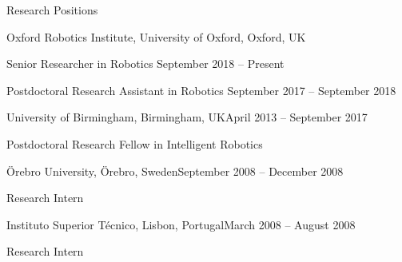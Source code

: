
\begin{rSection}{Research Positions}

\begin{rSubsection}{Oxford Robotics Institute, University of Oxford, Oxford, UK}{}{}{}
\item Senior Researcher in Robotics \hfill September 2018 -- Present 
\item Postdoctoral Research Assistant in Robotics \hfill September 2017 -- September 2018 
\end{rSubsection}

\begin{rSubsection}{University of Birmingham, Birmingham, UK}{April 2013 -- September 2017}{}{}
\item Postdoctoral Research Fellow in Intelligent Robotics 
\end{rSubsection}

\begin{rSubsection}{\"Orebro University, \"Orebro, Sweden}{September 2008 -- December 2008}{}{}
\item Research Intern 
\end{rSubsection}

\begin{rSubsection}{Instituto Superior T\'ecnico, Lisbon, Portugal}{March 2008 -- August 2008}{}{}
\item Research Intern 
\end{rSubsection}


\end{rSection}
